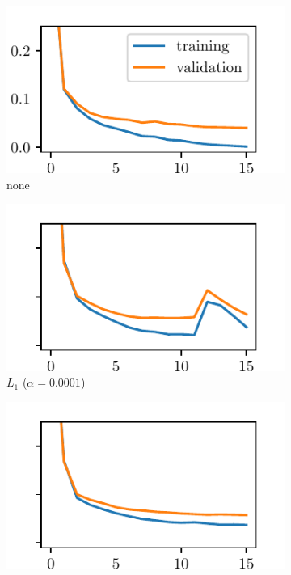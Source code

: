 \documentclass[a4paper,11pt]{article}
\begin{document}
\begin{figure}
  \centering
  \begin{subfigure}[b]{0.3\textwidth}
    \includegraphics[width=\textwidth]{assets/error_noreg.pdf}
    \caption{none}
    \label{fig:errorregl1}
  \end{subfigure}
  \begin{subfigure}[b]{0.3\textwidth}
    \includegraphics[width=\textwidth]{assets/error_l1.pdf}
    \caption{$L_1$ ($\alpha=0.0001$)}
    \label{fig:errorregl1}
  \end{subfigure}
  \begin{subfigure}[b]{0.3\textwidth}
    \includegraphics[width=\textwidth]{assets/error_l2.pdf}

\end{subfigure}
\end{figure}
\end{document}
